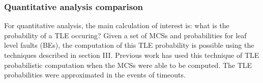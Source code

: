 \subsubsection{Quantitative analysis comparison}
For quantitative analysis, the main calculation of interest is: what is the probability of a TLE occuring? Given a set of MCSs and probabilities for leaf level faults (BEs), the computation of this TLE probability is possible using the techniques described in section III. Previous work has used this technique of TLE probabilistic computation when the MCSs were able to be computed. The TLE probabilities were approximated in the events of timeouts. 
